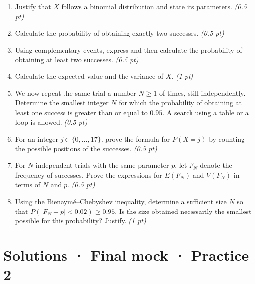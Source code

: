 \begin{enumerate}

\item Justify that $X$ follows a binomial distribution and state its parameters. \hfill\textit{(0.5 pt)}

\item Calculate the probability of obtaining exactly two successes. \hfill\textit{(0.5 pt)}

\item Using complementary events, express and then calculate the probability of obtaining at least two successes. \hfill\textit{(0.5 pt)}

\item Calculate the expected value and the variance of $X$. \hfill\textit{(1 pt)}

\item We now repeat the same trial a number $N\ge1$ of times, still independently. Determine the smallest integer $N$ for which the probability of obtaining at least one success is greater than or equal to $\num{0,95}$. A search using a table or a loop is allowed. \hfill\textit{(0.5 pt)}

\item For an integer $j\in\{0,\ldots,17\}$, prove the formula for $P(X=j)$ by counting the possible positions of the successes. \hfill\textit{(0.5 pt)}

\item For $N$ independent trials with the same parameter $p$, let $F_N$ denote the frequency of successes. Prove the expressions for $E(F_N)$ and $V(F_N)$ in terms of $N$ and $p$. \hfill\textit{(0.5 pt)}

\item Using the Bienaymé–Chebyshev inequality, determine a sufficient size $N$ so that $P(|F_N-p|<\num{0,02})\ge\num{0,95}$. Is the size obtained necessarily the smallest possible for this probability? Justify. \hfill\textit{(1 pt)}

\end{enumerate}

\ifmxteacher\mxnewpage

\section*{Solutions · Final mock · Practice 2}\label{cor:9-2}


